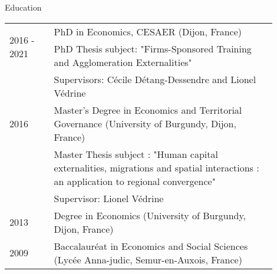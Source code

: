 \documentclass{resume} %
\begin{document}
\begin{rSection}{Education}
\begin{table}[H]
{\def\arraystretch{1.5}\tabcolsep=0pt
\begin{tabular}{p{0.15\linewidth}p{0.75\linewidth}}

  \multirow{2}{*}[0.85em]{2016 - 2021} & PhD in Economics, CESAER (Dijon, France) \\
  
  & \footnotesize{PhD Thesis subject: "Firms-Sponsored Training and Agglomeration Externalities"} \\
  & \footnotesize{Supervisors: Cécile Détang-Dessendre and Lionel Védrine} \\
  
  2016 & Master's Degree in Economics and Territorial Governance (University of Burgundy, Dijon, France)\\
  & \footnotesize{Master Thesis subject : "Human capital externalities, migrations and spatial interactions : an application to regional convergence"} \\
  & \footnotesize{Supervisor: Lionel Védrine} \\

  2013 &  Degree in Economics (University of Burgundy, Dijon, France) \\
  
  2009 & Baccalauréat in Economics and Social Sciences (Lycée Anna-judic, Semur-en-Auxois, France)

\end{tabular}%
}
\end{table}
\end{rSection}
\end{document}
